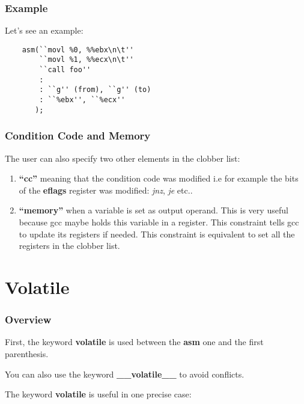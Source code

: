{%

\begin{frame}[containsverbatim]
  \frametitle{Example}

  Let's see an example:

  \begin{verbatim}
    asm(``movl %0, %%ebx\n\t''
        ``movl %1, %%ecx\n\t''
        ``call foo''
        :
        : ``g'' (from), ``g'' (to)
        : ``%ebx'', ``%ecx''
       );
  \end{verbatim}
\end{frame}


\begin{frame}
  \frametitle{Condition Code and Memory}

  The user can also specify two other elements in the clobber list:

  \begin{enumerate}
    \item
      \textbf{``cc''} meaning that the condition code was modified i.e
      for example the bits of the \textbf{eflags} register was modified:
      \textit{jnz}, \textit{je} etc..
    \item
      \textbf{``memory''} when a variable is set as output operand. This is
      very useful because gcc maybe holds this variable in a register.
      This constraint tells gcc to update its registers if needed.
      This constraint is equivalent to set all the registers in the
      clobber list.
  \end{enumerate}
\end{frame}

%
%

\section{Volatile}


\begin{frame}
  \frametitle{Overview}

  First, the keyword \textbf{volatile} is used between the \textbf{asm}
  one and the first parenthesis.

  \nl

  You can also use the keyword \textbf{\_\_volatile\_\_} to avoid conflicts.

  \nl

  The keyword \textbf{volatile} is useful in one precise case:


\end{frame}}
